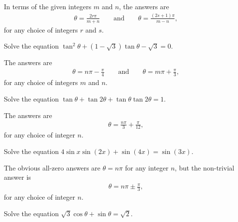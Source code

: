 \documentclass[12pt,a4paper]{memoir}
\theoremstyle{definition}
\begin{document}
\begin{solution}
	In terms of the given integers $m$ and $n$, the answers are 
	\begin{align*}
		\theta = \frac{2r\pi}{m+n} \qquad \text{and} \qquad  \theta = \frac{(2s+1)\pi}{m-n},
	\end{align*}
	for any choice of integers $r$ and $s$.
\end{solution}





\begin{question}
	Solve the equation $\tan^2 \theta + (1-\sqrt 3)\tan \theta - \sqrt 3= 0$.
\end{question}

\begin{solution}
	The answers are 
	\begin{align*}
		\theta = n\pi-\frac{\pi}{4} \qquad \text{and} \qquad  \theta = m\pi+\frac{\pi}{3},
	\end{align*}
	for any choice of integers $m$ and $n$.
\end{solution}


\begin{question}
	Solve the equation $\tan \theta + \tan 2\theta + \tan \theta \tan 2\theta= 1$.
\end{question}

\begin{solution}
	The answers are 
	\begin{align*}
		\theta = \frac{n\pi}{3}+\frac{\pi}{12},
	\end{align*}
	for any choice of integer $n$.
\end{solution}


\begin{question}
	Solve the equation $4\sin x \sin (2x) + \sin (4x)= \sin(3x)$.
\end{question}

\begin{solution}
	The obvious all-zero answers are $\theta=n\pi$ for any integer $n$, but the non-trivial answer is  
	\begin{align*}
		\theta = n\pi\pm\frac{\pi}{3},
	\end{align*}
	for any choice of integer $n$.
\end{solution}



\begin{question}
	Solve the equation $\sqrt 3 \cos \theta + \sin \theta = \sqrt 2$.
\end{question}
\end{document}
